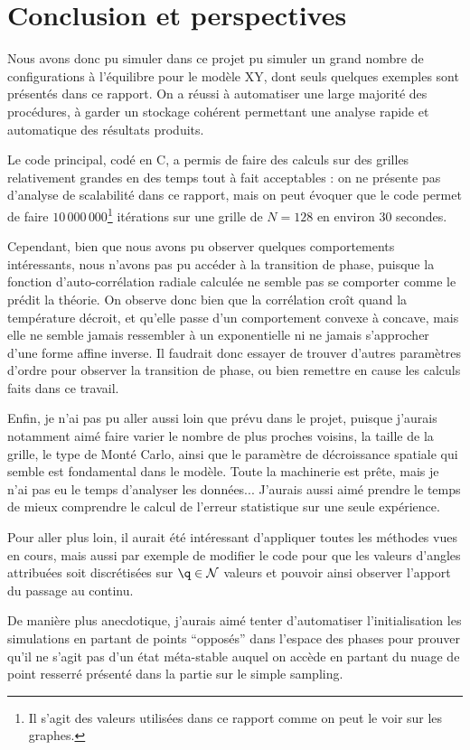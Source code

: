 \documentclass[a4paper, 11pt]{article}
\begin{document}
\section{Conclusion et perspectives}

Nous avons donc pu simuler dans ce projet pu simuler un grand nombre de configurations à l'équilibre
pour le modèle XY, dont seuls quelques exemples sont présentés dans ce rapport. On a réussi à
automatiser une large majorité des procédures, à garder un stockage cohérent permettant une analyse
rapide et automatique des résultats produits.

Le code principal, codé en C, a permis de faire des calculs sur des grilles relativement grandes en
des temps tout à fait acceptables : on ne présente pas d'analyse de scalabilité dans ce rapport, mais
on peut évoquer que le code permet de faire $10\,000\,000$\footnote{Il s'agit des valeurs
utilisées dans ce rapport comme on peut le voir sur les graphes.} itérations sur une grille de
$N=128$ en environ 30 secondes. 

Cependant, bien que nous avons pu observer quelques comportements intéressants, nous n'avons pas pu
accéder à la transition de phase, puisque la fonction d'auto-corrélation radiale calculée ne semble
pas se comporter comme le prédit la théorie. On observe donc bien que la corrélation croît quand la
température décroit, et qu'elle passe d'un comportement convexe à concave, mais elle ne semble
jamais ressembler à un exponentielle ni ne jamais s'approcher d'une forme affine inverse. Il
faudrait donc essayer de trouver d'autres paramètres d'ordre pour observer la transition de phase,
ou bien remettre en cause les calculs faits dans ce travail. 

Enfin, je n'ai pas pu aller aussi loin que prévu dans le projet, puisque j'aurais notamment aimé
faire varier le nombre de plus proches voisins, la taille de la grille, le type de Monté Carlo,
ainsi que le paramètre de décroissance spatiale qui semble est fondamental dans le modèle. Toute la
machinerie est prête, mais je n'ai pas eu le temps d'analyser les données... J'aurais aussi aimé
prendre le temps de mieux comprendre le calcul de l'erreur statistique sur une seule expérience. 

Pour aller plus loin, il aurait été intéressant d'appliquer toutes les méthodes vues en cours, mais
aussi par exemple de modifier le code pour que les valeurs d'angles attribuées soit discrétisées sur
$\q \in \mathcal{N}$ valeurs et pouvoir ainsi observer l'apport du passage au continu. 

De manière plus anecdotique, j'aurais aimé tenter d'automatiser l'initialisation les simulations en
partant de points ``opposés'' dans l'espace des phases pour prouver qu'il ne s'agit pas d'un état
méta-stable auquel on accède en partant du nuage de point resserré présenté dans la partie sur le
simple sampling. 



\end{document}
